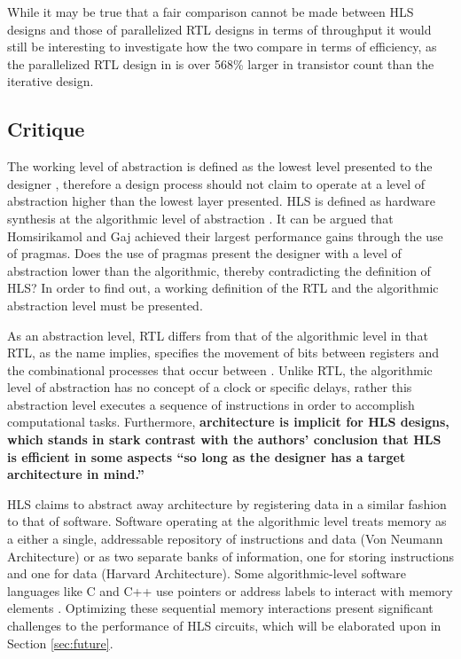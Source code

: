 \documentclass[12pt,journal,compsoc,onecolumn]{IEEEtran}
\begin{document}
While it may be true that a fair comparison cannot be made between HLS designs and those of parallelized RTL designs in terms of throughput it would still be interesting to investigate how the two compare in terms of efficiency, as the parallelized RTL design in \cite{nsaweeks} is over 568\% larger in transistor count than the iterative design. 

\subsection{Critique}
The working level of abstraction is defined as the lowest level presented to the designer \cite{Harris+Harris}, therefore a design process should not claim to operate at a level of abstraction higher than the lowest layer presented. HLS is defined as hardware synthesis at the algorithmic level of abstraction \cite{3}\cite{4}. It can be argued that Homsirikamol and Gaj achieved their largest performance gains through the use of pragmas. Does the use of pragmas present the designer with a level of abstraction lower than the algorithmic, thereby contradicting the definition of HLS? In order to find out, a working definition of the RTL and the algorithmic abstraction level must be presented.

As an abstraction level, RTL differs from that of the algorithmic level in that RTL, as the name implies, specifies the movement of bits between registers and the combinational processes that occur between \cite{churtl}. Unlike RTL, the algorithmic level of abstraction has no concept of a clock or specific delays, rather this abstraction level executes a sequence of instructions in order to accomplish computational tasks\cite{churtl}. Furthermore, \textbf{architecture is implicit for HLS designs\cite{bsv}, which stands in stark contrast with the authors' conclusion that HLS is efficient in some aspects ``so long as the designer has a target architecture in mind.'' }

HLS claims to abstract away architecture by registering data in a similar fashion to that of software\cite{legup}. Software operating at the algorithmic level treats memory as a either a single, addressable repository of instructions and data (Von Neumann Architecture) or as two separate banks of information, one for storing instructions and one for data (Harvard Architecture). Some algorithmic-level software languages like C and C++ use pointers or address labels to interact with memory elements \cite{cpointers}. Optimizing these sequential memory interactions present significant challenges to the performance of HLS circuits, which will be elaborated upon in Section \ref{sec:future}.
\end{document}
